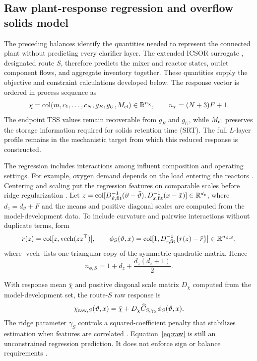 \documentclass[a4paper,fleqn]{cas-sc}
\DeclareMathOperator{\vech}{vech}
\newcommand{\R}{\mathbb{R}}
\newcommand{\col}{\operatorname{col}}
\begin{document}
\subsection{Raw plant-response regression and overflow solids model}

The preceding balances identify the quantities needed to represent the connected plant without predicting every clarifier layer. The extended ICSOR surrogate \citep{Selerio2026}, designated route $S$, therefore predicts the mixer and reactor states, outlet component flows, and aggregate inventory together. These quantities supply the objective and constraint calculations developed below. The response vector is ordered in process sequence as
\begin{equation}
\chi=\col(m,c_1,\ldots,c_N,g_E,g_U,M_{\rm cl})
\in\R^{n_\chi},\qquad n_\chi=(N+3)F+1.
\label{eq:state}
\end{equation}
The endpoint TSS values remain recoverable from $g_E$ and $g_U$, while $M_{\rm cl}$ preserves the storage information required for solids retention time (SRT). The full $L$-layer profile remains in the mechanistic target from which this reduced response is constructed.

The regression includes interactions among influent composition and operating settings. For example, oxygen demand depends on the load entering the reactors \citep{Henze2008}. Centering and scaling put the regression features on comparable scales before ridge regularization \citep{Hastie2009}. Let $z=\col[D_{\vartheta,{\rm fit}}^{-1}(\vartheta-\bar\vartheta),D_{x,{\rm fit}}^{-1}(x-\bar x)]\in\R^{d_z}$, where $d_z=d_\vartheta+F$ and the means and positive diagonal scales are computed from the model-development data. To include curvature and pairwise interactions without duplicate terms, form
\begin{equation}
r(z)=\col[z,\vech(zz^\top)],\qquad
\phi_S(\vartheta,x)=\col[1,D_{r,{\rm fit}}^{-1}\{r(z)-\bar r\}]
\in\R^{n_{\phi,S}},
\label{eq:features}
\end{equation}
where $\vech$ lists one triangular copy of the symmetric quadratic matrix. Hence
\begin{equation}
n_{\phi,S}=1+d_z+\frac{d_z(d_z+1)}2.
\label{eq:featurecount}
\end{equation}

With response mean $\bar\chi$ and positive diagonal scale matrix $D_\chi$ computed from the model-development set, the route-$S$ raw response is
\begin{equation}
\chi_{{\rm raw},S}(\vartheta,x)=\bar\chi+D_\chi\widehat C_{S,\gamma_S}\phi_S(\vartheta,x).
\label{eq:raw}
\end{equation}
The ridge parameter $\gamma_S$ controls a squared-coefficient penalty that stabilizes estimation when features are correlated \citep{Hastie2009}. Equation~\eqref{eq:raw} is still an unconstrained regression prediction. It does not enforce sign or balance requirements \citep{KircherVotsmeier2025}.
\end{document}
